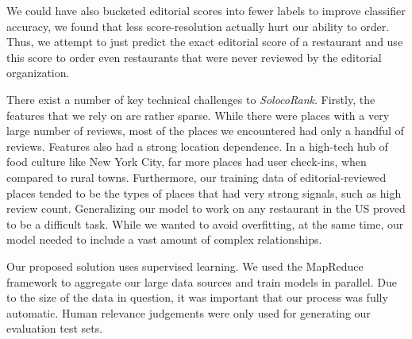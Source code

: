 We could have also bucketed editorial scores into fewer labels to improve
classifier accuracy, we found that less score-resolution actually hurt our
ability to order.
Thus, we attempt to just predict the exact editorial score of a restaurant
and use this score to order even restaurants that were never reviewed by 
the editorial organization.

There exist a number of key technical challenges to \emph{SolocoRank}.
Firstly, the features that we rely on are rather sparse.
While there were places with a very large number of reviews, 
most of the places we encountered had only a handful of reviews.
Features also had a strong location dependence.
In a high-tech hub of food culture like New York City,
far more places had user check-ins,
when compared to rural towns.
Furthermore, our training data of editorial-reviewed places
tended to be the types of places that had very strong signals, such as high review count.
Generalizing our model to work on any restaurant in the US proved to be a difficult task.
While we wanted to avoid overfitting, at the same time, our model needed to include
a vast amount of complex relationships.

Our proposed solution uses supervised learning.
We used the MapReduce \cite{mapreduce} framework to aggregate our large data sources
and train models in parallel. 
Due to the size of the data in question, it was important that our process was
fully automatic. 
Human relevance judgements were only used for generating our evaluation test sets.

